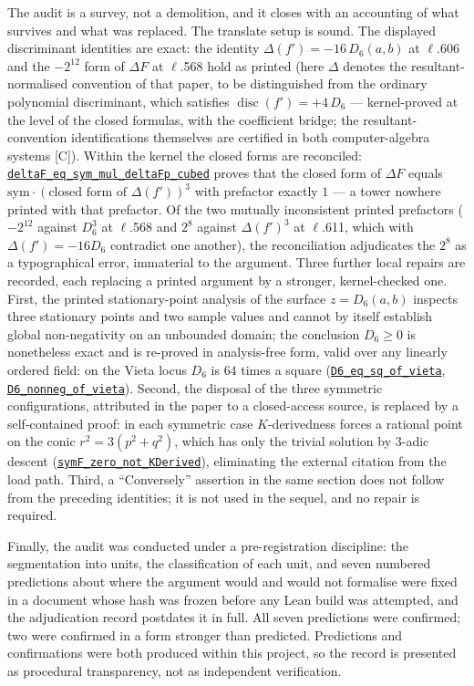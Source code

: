 \documentclass[11pt]{amsart}
\newcommand{\repourl}{https://github.com/hirokifukui/rd-quartics-classification}
\newcommand{\repotag}{v1.1.0}
\newcommand{\leanline}[3]{\href{\repourl/blob/\repotag/#1\#L#2}{\texttt{#3}}}
\begin{document}
The audit is a survey, not a demolition, and it closes with an
accounting of what survives and what was replaced.  The translate setup
is sound.  The displayed discriminant identities are exact: the identity
$\Delta(f')=-16\,D_6(a,b)$ at $\ell$.606 and the $-2^{12}$ form of
$\Delta F$ at $\ell$.568 hold as printed (here $\Delta$ denotes the
resultant-normalised convention of that paper, to be distinguished from
the ordinary polynomial discriminant, which satisfies
$\operatorname{disc}(f')=+4\,D_6$ --- kernel-proved at the level of the
closed formulas, with the coefficient bridge; the resultant-convention
identifications themselves are certified in both computer-algebra
systems [C]).  Within the kernel the closed forms are reconciled:
\leanline{Gap/BMThm7Transcript.lean}{157}{deltaF\_eq\_sym\_mul\_deltaFp\_cubed}
proves that the closed form of $\Delta F$ equals
$\mathrm{sym}\cdot(\text{closed form of }\Delta(f'))^3$ with prefactor
exactly $1$ --- a tower nowhere printed with that prefactor.  Of the two
mutually inconsistent printed prefactors ($-2^{12}$ against $D_6^3$ at
$\ell$.568 and $2^8$ against $\Delta(f')^3$ at $\ell$.611, which with
$\Delta(f')=-16D_6$ contradict one another), the reconciliation
adjudicates the $2^8$ as a typographical error, immaterial to the
argument.  Three further local
repairs are recorded, each replacing a printed argument by a stronger,
kernel-checked one.  First, the printed stationary-point analysis of
the surface $z=D_6(a,b)$ inspects three stationary points and two
sample values and cannot by itself establish global non-negativity on
an unbounded domain; the conclusion $D_6\ge 0$ is nonetheless exact and
is re-proved in analysis-free form, valid over any linearly ordered
field: on the Vieta locus $D_6$ is $64$ times a square
(\leanline{Gap/BMThm7Transcript.lean}{258}{D6\_eq\_sq\_of\_vieta},
\leanline{Gap/BMThm7Transcript.lean}{278}{D6\_nonneg\_of\_vieta}).
Second, the disposal of the three symmetric configurations, attributed
in the paper to a closed-access source, is replaced by a self-contained
proof: in each symmetric case $K$-derivedness forces a rational point
on the conic $r^2=3(p^2+q^2)$, which has only the trivial solution by
$3$-adic descent
(\leanline{Gap/BMThm7Transcript.lean}{636}{symF\_zero\_not\_KDerived}),
eliminating the external citation from the load path.  Third, a
``Conversely'' assertion in the same section does not follow from the
preceding identities; it is not used in the sequel, and no repair is
required.

Finally, the audit was conducted under a pre-registration discipline:
the segmentation into units, the classification of each unit, and seven
numbered predictions about where the argument would and would not
formalise were fixed in a document whose hash was frozen before any
Lean build was attempted, and the adjudication record postdates it in
full.  All seven predictions were confirmed; two were confirmed in a
form stronger than predicted.  Predictions and confirmations were both
produced within this project, so the record is presented as procedural
transparency, not as independent verification.
\end{document}
